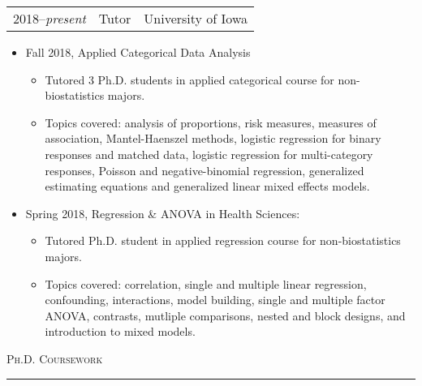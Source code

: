 \documentclass[a4paper]{article}
\begin{document}
\begin{tabular*}{0.95\textwidth}{@{\extracolsep{\fill}}ccc}
  2018--\textit{present} & Tutor & University of Iowa  \\
\end{tabular*}
\begin{itemize}[itemsep = 0.3ex, leftmargin = 1cm]
  \item Fall 2018, Applied Categorical Data Analysis
  \begin{itemize}[itemsep = 0.3ex]
    \item Tutored 3 Ph.D. students in applied categorical course for non-biostatistics majors.
    \item Topics covered: analysis of proportions, risk measures, measures of association,
      Mantel-Haenszel methods, logistic regression for binary responses and matched data,
      logistic regression for multi-category responses, Poisson and negative-binomial
      regression, generalized estimating equations and generalized linear mixed effects models.
  \end{itemize}
  \item Spring 2018, Regression \& ANOVA in Health Sciences:
  \begin{itemize}[itemsep = 0.3ex]
    \item Tutored Ph.D. student in applied regression course for non-biostatistics majors.
    \item Topics covered: correlation, single and multiple linear regression, confounding, interactions, model building,
      single and multiple factor ANOVA, contrasts, mutliple comparisons, nested and block designs, and introduction to
      mixed models.
  \end{itemize}
\end{itemize}
\vspace{0.25\baselineskip}

\newpage

\begin{flushleft}
  \Large\textsc{Ph.D. Coursework}
  \textcolor{usafagrey}{\rule[0.5\baselineskip]{\textwidth}{0.75pt}}
\end{flushleft}
\vspace{-1.5\baselineskip}
\end{document}
